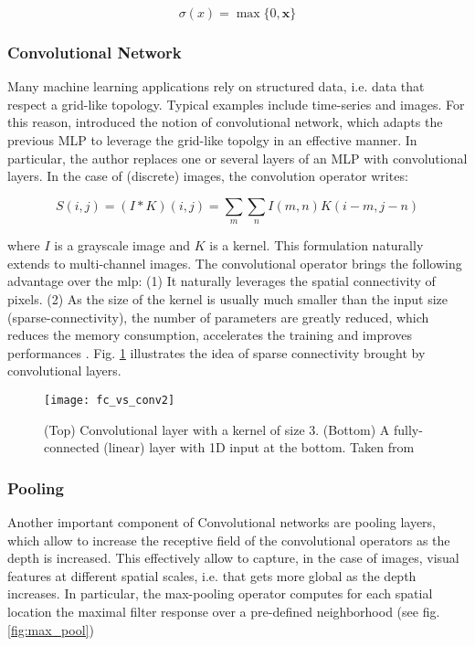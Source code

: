\begin{equation}
\sigma(x) = \max \{0, \bm{x}\}
\end{equation}

\subsubsection{Convolutional Network}
Many machine learning applications rely on structured data, i.e. data that respect a grid-like topology.
Typical examples include time-series and images.
For this reason, \cite{lecun95} introduced the notion of convolutional network, which adapts the previous MLP to leverage the grid-like topolgy in an effective manner.
In particular, the author replaces one or several layers of an MLP with convolutional layers.
In the case of (discrete) images, the convolution operator writes:

\begin{equation}
S(i,j) = (I * K)(i,j) = \sum_{m} \sum_{n} I(m,n) K(i-m, j-n)
\end{equation}

where $I$ is a grayscale image and $K$ is a kernel.
This formulation naturally extends to multi-channel images.
The convolutional operator brings the following advantage over the \gls{mlp}: (1) It naturally leverages the spatial connectivity of pixels.
(2) As the size of the kernel is usually much smaller than the input size (sparse-connectivity), the number of parameters are greatly reduced, which reduces the memory consumption, accelerates the training and improves performances \cite{lecun95}.
Fig. \ref{fig:cnn_con} illustrates the idea of sparse connectivity brought by convolutional layers.

\begin{figure}[!htpb]
  \centering
  \texttt{[image: fc\_vs\_conv2]}
  \caption{(Top) Convolutional layer with a kernel of size 3. (Bottom) A fully-connected (linear) layer with 1D input at the bottom. Taken from \cite{goodfellow16}}
  \label{fig:cnn_con}
\end{figure}

\subsubsection{Pooling}

Another important component of Convolutional networks are pooling layers, which allow to increase the receptive field of the convolutional operators as the depth is increased.
This effectively allow to capture, in the case of images, visual features at different spatial scales, i.e. that gets more global as the depth increases.
In particular, the max-pooling operator computes for each spatial location the maximal filter response over a pre-defined neighborhood (see fig. \ref{fig:max_pool})

